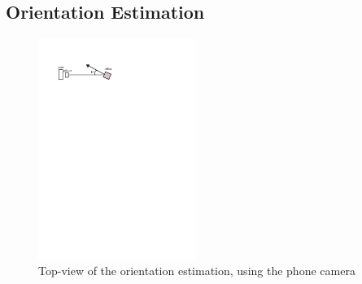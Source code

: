 \documentclass[journal]{IEEEtran}
\let\MYoriglatexcaption\caption
\renewcommand{\caption}[2][\relax]{\MYoriglatexcaption[#2]{#2}}
\begin{document}
\subsection{Orientation Estimation}
\begin{figure}[!htpb]
\centering
\includegraphics[width=2in]{images/orientation_meas}
\caption{Top-view of the orientation estimation, using the phone camera}
\label{fig:orient_camera}
\end{figure}

%
%

\end{document}
